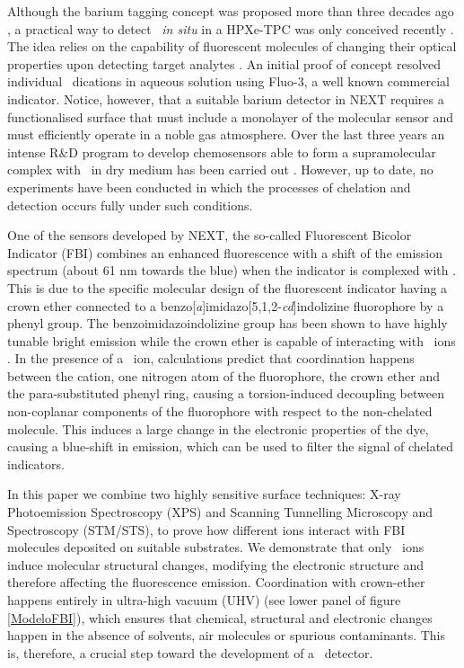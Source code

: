 \documentclass[aps,prl,reprint,longbibliography,superscriptaddress, english]{revtex4-1}
\begin{document}
Although the barium tagging concept was proposed more than three decades ago \cite{Moe:1991ik}, a practical way to detect \Bapp\ {\it in situ} in a HPXe-TPC was only conceived recently \cite{Nygren_2015, Jones:2016qiq}. The idea relies on the capability of fluorescent molecules of changing their optical properties upon detecting target analytes \cite{valeur_chemical,wolfbeis_materials_2005}. An initial proof of concept \cite{McDonald:2017izm} resolved individual \Bapp\ dications in aqueous solution using Fluo-3, a well known commercial indicator. Notice, however, that a suitable barium detector in NEXT requires a functionalised surface that must include a monolayer of the molecular sensor and must efficiently operate in a noble gas atmosphere. Over the last three years an intense R\&D program to develop chemosensors able to form a supramolecular complex with \Bapp\ in dry medium has been carried out \cite{Thapa:2019zjk, rivilla_fluorescent_2020,thapa_demonstration_2021}. However, up to date, no experiments have been conducted in which the processes of chelation and detection occurs fully under such conditions.

One of the sensors developed by NEXT, the so-called
Fluorescent Bicolor Indicator (FBI) \cite{rivilla_fluorescent_2020} combines an enhanced fluorescence with a shift of the emission spectrum (about 61 nm towards the blue) when the indicator is complexed with \Bapp.  This is due to the specific molecular design of the fluorescent indicator having a crown ether connected to a benzo[\textit{a}]imidazo[5,1,2-\textit{cd}]indolizine fluorophore by a phenyl group. The benzoimidazoindolizine group has been shown to have highly tunable bright emission \cite{Stasyuk_benzo,Levesque_general} while the crown ether is capable of interacting with \Bapp\ ions \cite{valeur_chemical,maleknia_cavity-size-dependent_2002}. In the presence of a \Bapp\ ion, calculations predict that coordination happens between the cation, one nitrogen atom of the fluorophore, the crown ether and the para-substituted phenyl ring, causing a  {torsion-induced decoupling between non-coplanar components of the fluorophore with respect} to the non-chelated molecule. This induces a large change in the electronic properties of the dye, causing a blue-shift in emission, which can be used to filter the signal of chelated indicators.

In this paper we combine two highly sensitive surface techniques: X-ray Photoemission Spectroscopy (XPS) and Scanning Tunnelling Microscopy and Spectroscopy (STM/STS), to prove how different ions interact with FBI molecules deposited on suitable substrates. We demonstrate that only \Bapp\ ions induce molecular structural changes, modifying the electronic structure and therefore affecting the fluorescence emission. Coordination with crown-ether happens entirely in ultra-high vacuum (UHV) (see lower panel of figure {\ref{ModeloFBI}}), which ensures that chemical, structural and electronic changes happen in the absence of solvents, air molecules or spurious contaminants. This is, therefore, a crucial step toward the development of a \Bapp\ detector. 
\end{document}
